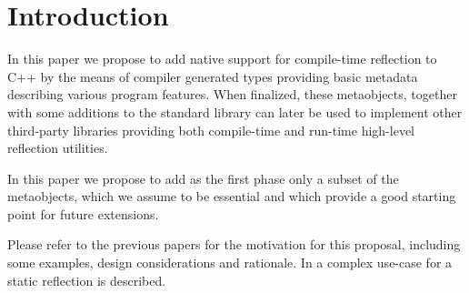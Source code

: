 \section{Introduction}

In this paper we propose to add native support for
compile-time reflection to C++ by the means of compiler generated
types providing basic metadata describing various program features.
When finalized, these metaobjects, together with some additions to the standard
library can later be used to implement other third-party libraries
providing both compile-time and run-time high-level
reflection utilities.

In this paper we propose to add as the first phase
only a subset of the metaobjects, which we assume to be essential
and which provide a good starting point for future extensions.

Please refer to the previous papers \cite{n3996,n4111,n4451,n4452}
for the motivation for this proposal, including some examples,
design considerations and rationale. In \cite{ITFPWTHOR} a complex use-case
for a static reflection is described.

